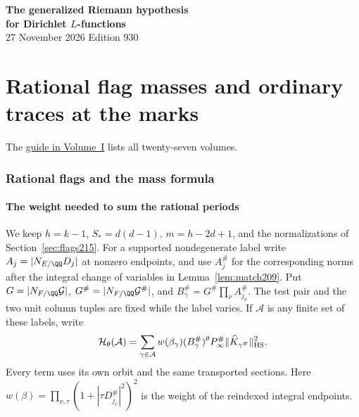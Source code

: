 \documentclass[a4paper,11pt]{article}
\theoremstyle{definition}
\theoremstyle{remark}
\numberwithin{equation}{section}
\begin{document}
\setcounter{part}{20}
\thispagestyle{plain}\begin{center}
{\LARGE\bfseries The generalized Riemann hypothesis\\[2pt]for Dirichlet \(L\)-functions}\\[6pt]
{\small 27 November 2026 \quad\textperiodcentered\quad Edition 930}\end{center}
\part{Rational flag masses and ordinary traces at the marks}\label{part:XXI}
\begin{abstract}\noindent We count rational flags and their stabilizers, compute the mass of the terminal classes and use it in the ordinary trace. The last section identifies the mixed terms and the identity coefficient at the two marked primes.\end{abstract}
\setcounter{section}{108}
\noindent The \hyperref[seriesguide]{guide in Volume~I} lists all twenty-seven volumes.
\begingroup\small\setlength{\parskip}{0pt}\tableofcontents\endgroup
\clearpage

\section{Rational flags and the mass formula}\label{nav:g-XI-0}\label{nav:volume-XXI}

\subsection{The weight needed to sum the rational periods}\label{nav:IX-09}
\label{sec:moment217}

We keep \(h=k-1\), \(S_*=d(d-1)\), \(m=h-2d+1\), and the
normalizations of Section~\ref{sec:flags215}. For a supported
nondegenerate label write \(A_j=|N_{E/\QQ}D_j|\) at nonzero
endpoints, and use \(A_j^\#\) for the corresponding norms after
the integral change of variables in Lemma~\ref{lem:match209}.
Put \(G=|N_{F/\QQ}\mathcal G|\), \(G^\#=|N_{F/\QQ}\mathcal G^\#|\),
and \(B_\gamma^\#=G^\#\prod_\nu A_{j_\nu}^\#\).
The test pair and the two unit column tuples are fixed while the
label varies. If \(\mathcal A\) is any finite set of these labels,
write
\[
   \mathcal H_\theta(\mathcal A)
     =\sum_{\gamma\in\mathcal A} w(\beta_\gamma)(B_\gamma^\#)^\theta
               P_\infty^\#\|\widehat K_{\gamma^\#}\|_{\rm HS}^2 .
\]
Every term uses its own orbit and the same transported sections.
Here \(w(\beta)=\prod_{\nu,\tau}(1+|\tau D_{j_\nu}^\#|^2)^2\)
is the weight of the reindexed integral endpoints.
\end{document}
